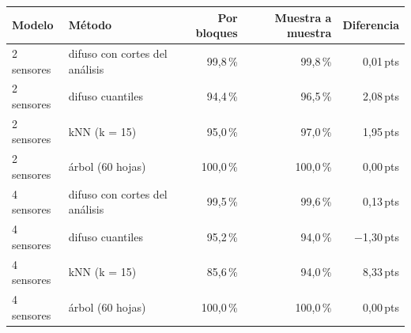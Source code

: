 \begin{tabular}{llrrr}
\toprule
Modelo & Método & Por bloques & Muestra a muestra & Diferencia \\
\midrule
2 sensores & difuso con cortes del análisis & 99,8\,\% & 99,8\,\% & 0,01\,pts \\
2 sensores & difuso cuantiles & 94,4\,\% & 96,5\,\% & 2,08\,pts \\
2 sensores & kNN (k = 15) & 95,0\,\% & 97,0\,\% & 1,95\,pts \\
2 sensores & árbol (60 hojas) & 100,0\,\% & 100,0\,\% & 0,00\,pts \\
4 sensores & difuso con cortes del análisis & 99,5\,\% & 99,6\,\% & 0,13\,pts \\
4 sensores & difuso cuantiles & 95,2\,\% & 94,0\,\% & $-$1,30\,pts \\
4 sensores & kNN (k = 15) & 85,6\,\% & 94,0\,\% & 8,33\,pts \\
4 sensores & árbol (60 hojas) & 100,0\,\% & 100,0\,\% & 0,00\,pts \\
\bottomrule
\end{tabular}
